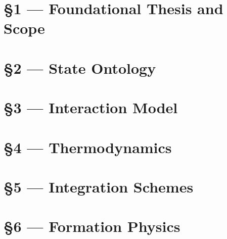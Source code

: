 \documentclass[11pt, letterpaper, oneside]{report}
\begin{document}
\chapter{\S1 --- Foundational Thesis and Scope}
\label{ch:s1}


\chapter{\S2 --- State Ontology}
\label{ch:s2}


\chapter{\S3 --- Interaction Model}
\label{ch:s3}


\chapter{\S4 --- Thermodynamics}
\label{ch:s4}


\chapter{\S5 --- Integration Schemes}
\label{ch:s5}


\chapter{\S6 --- Formation Physics}
\label{ch:s6}

\end{document}
